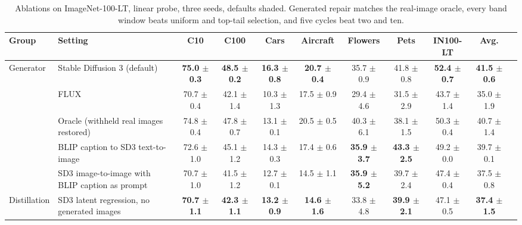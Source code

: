 \begin{table}[t]
\centering
\tiny
\setlength{\tabcolsep}{2.6pt}
\renewcommand{\arraystretch}{0.9}
\caption{Ablations on ImageNet-100-LT, linear probe, three seeds, defaults shaded. Generated repair matches the real-image oracle, every band window beats uniform and top-tail selection, and five cycles beat two and ten.}
\label{tab:main_ablation_combined}
\begin{adjustbox}{max width=\textwidth}
\begin{tabular}{l l c c c c c c c c c}
\toprule
Group & Setting & C10 & C100 & Cars & Aircraft & Flowers & Pets & IN100-LT & Avg. \\
\midrule
\rowcolor{blue!10} Generator & Stable Diffusion 3 (default) & \textbf{75.0 {\scriptsize$\pm$ 0.3}} & \textbf{48.5 {\scriptsize$\pm$ 0.2}} & \textbf{16.3 {\scriptsize$\pm$ 0.8}} & \textbf{20.7 {\scriptsize$\pm$ 0.4}} & 35.7 {\scriptsize$\pm$ 0.9} & 41.8 {\scriptsize$\pm$ 0.8} & \textbf{52.4 {\scriptsize$\pm$ 0.7}} & \textbf{41.5 {\scriptsize$\pm$ 0.6}} \\
 & FLUX & 70.7 {\scriptsize$\pm$ 0.4} & 42.1 {\scriptsize$\pm$ 1.4} & 10.3 {\scriptsize$\pm$ 1.3} & 17.5 {\scriptsize$\pm$ 0.9} & 29.4 {\scriptsize$\pm$ 4.6} & 31.5 {\scriptsize$\pm$ 2.9} & 43.7 {\scriptsize$\pm$ 1.4} & 35.0 {\scriptsize$\pm$ 1.9} \\
 & Oracle (withheld real images restored) & 74.8 {\scriptsize$\pm$ 0.4} & 47.8 {\scriptsize$\pm$ 0.7} & 13.1 {\scriptsize$\pm$ 0.1} & 20.5 {\scriptsize$\pm$ 0.5} & 40.3 {\scriptsize$\pm$ 6.1} & 38.1 {\scriptsize$\pm$ 1.5} & 50.3 {\scriptsize$\pm$ 0.4} & 40.7 {\scriptsize$\pm$ 1.4} \\
 & BLIP caption to SD3 text-to-image & 72.6 {\scriptsize$\pm$ 1.0} & 45.1 {\scriptsize$\pm$ 1.2} & 14.3 {\scriptsize$\pm$ 0.3} & 17.4 {\scriptsize$\pm$ 0.6} & \textbf{35.9 {\scriptsize$\pm$ 3.7}} & \textbf{43.3 {\scriptsize$\pm$ 2.5}} & 49.2 {\scriptsize$\pm$ 0.0} & 39.7 {\scriptsize$\pm$ 0.1} \\
 & SD3 image-to-image with BLIP caption as prompt & 70.7 {\scriptsize$\pm$ 1.0} & 41.5 {\scriptsize$\pm$ 1.2} & 12.7 {\scriptsize$\pm$ 0.1} & 14.5 {\scriptsize$\pm$ 1.1} & \textbf{35.9 {\scriptsize$\pm$ 5.2}} & 39.7 {\scriptsize$\pm$ 2.4} & 47.4 {\scriptsize$\pm$ 0.4} & 37.5 {\scriptsize$\pm$ 0.8} \\
\midrule
Distillation & SD3 latent regression, no generated images & \textbf{70.7 {\scriptsize$\pm$ 1.1}} & \textbf{42.3 {\scriptsize$\pm$ 1.1}} & \textbf{13.2 {\scriptsize$\pm$ 0.9}} & \textbf{14.6 {\scriptsize$\pm$ 1.6}} & 33.8 {\scriptsize$\pm$ 4.8} & \textbf{39.9 {\scriptsize$\pm$ 2.1}} & 47.1 {\scriptsize$\pm$ 0.5} & \textbf{37.4 {\scriptsize$\pm$ 1.5}} \\

\end{tabular}
\end{adjustbox}
\end{table}
